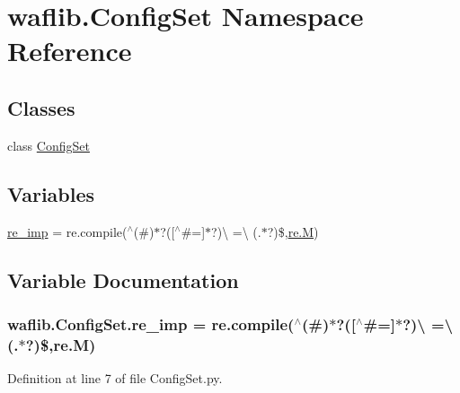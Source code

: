 \hypertarget{namespacewaflib_1_1_config_set}{}\section{waflib.\+Config\+Set Namespace Reference}
\label{namespacewaflib_1_1_config_set}
\subsection*{Classes}
\begin{DoxyCompactItemize}
\item 
class \hyperlink{classwaflib_1_1_config_set_1_1_config_set}{Config\+Set}
\end{DoxyCompactItemize}
\subsection*{Variables}
\begin{DoxyCompactItemize}
\item 
\hyperlink{namespacewaflib_1_1_config_set_a7e11934cfd43297f0da863e88490d74e}{re\+\_\+imp} = re.\+compile(\textquotesingle{}$^\wedge$(\#)$\ast$?(\mbox{[}$^\wedge$\#=\mbox{]}$\ast$?)\textbackslash{} =\textbackslash{} (.$\ast$?)\$\textquotesingle{},\hyperlink{rfft2d_test_m_l_8m_aad05f78187c942f9dd521605fa81f1ba}{re.\+M})
\end{DoxyCompactItemize}


\subsection{Variable Documentation}
\subsubsection[{\texorpdfstring{re\+\_\+imp}{re_imp}}]{\setlength{\rightskip}{0pt plus 5cm}waflib.\+Config\+Set.\+re\+\_\+imp = re.\+compile(\textquotesingle{}$^\wedge$(\#)$\ast$?(\mbox{[}$^\wedge$\#=\mbox{]}$\ast$?)\textbackslash{} =\textbackslash{} (.$\ast$?)\$\textquotesingle{},{\bf re.\+M})}\hypertarget{namespacewaflib_1_1_config_set_a7e11934cfd43297f0da863e88490d74e}{}\label{namespacewaflib_1_1_config_set_a7e11934cfd43297f0da863e88490d74e}


Definition at line 7 of file Config\+Set.\+py.


